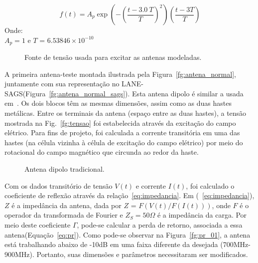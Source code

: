 \begin{equation}\label{eq:trem}
	f(t) = A_{p}\exp \left( - \left( \frac{t-3.0\ T}{T}  \right)^2 \right )  \left( \frac{t-3T}{T} \right)
\end{equation}
Onde:\\
$A_p = 1$ e $T$ =  $6.53846\times10^{-10}$
\begin{figure}[!ht]
	\begin{center}
\qquad
	\end{center}
	\caption{Fonte de tensão usada para excitar as antenas modeladas.}
	\label{fg:fontes}
\end{figure}

	A primeira antena-teste montada ilustrada pela Figura~\ref{fg:antena_normal}, juntamente com sua representação no LANE-SAGS(Figura~\ref{fg:antena_normal_sags}). Esta antena dipolo é similar a usada em~\cite{josivaldo}. Os dois blocos têm as mesmas dimensões, assim como as duas hastes metálicas. Entre os terminais da antena (espaço entre as duas hastes), a tensão mostrada na Fig.~\ref{fg:tensao} foi estabelecida através da excitação do campo elétrico. Para fins de projeto, foi calculada a corrente transitória em uma das hastes (na célula vizinha à célula de excitação do campo elétrico) por meio do rotacional do campo magnético que circunda ao redor da haste.

\begin{figure}[!ht]
	\begin{center}
\qquad
	\end{center}
	\caption{Antena dipolo tradicional.}
	\label{fg:antena_normal_m}
\end{figure}

	Com os dados transitório de tensão $V(t)$ e corrente $I(t)$, foi calculado o coeficiente de reflexão através da relação~\ref{eq:impedancia}. Em (~\ref{eq:impedancia}), $Z$ é a impedância da antena, dada por $Z$ = $F(V(t)/F(I(t)))$, onde $F$ é o operador da transformada de Fourier e $Z_S = 50\Omega$ é a impedância da carga. Por meio deste coeficiente $\Gamma$, pode-se calcular a perda de retorno, associada a essa antena(Equação~\ref{eq:pr}). Como pode-se observar na  Figura~\ref{fg:pr_01}, a antena está trabalhando abaixo de -10dB em uma faixa diferente da desejada (700MHz-900MHz). Portanto, suas dimensões e parâmetros necessitaram ser modificados.

